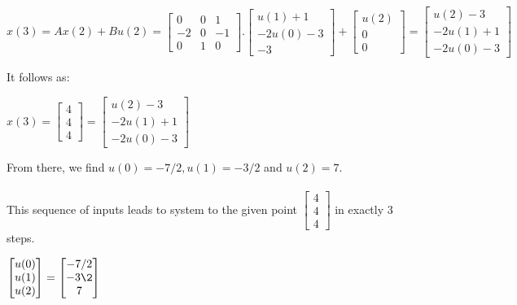 \documentclass[12pt,a4paper, margin=1in]{article}
\begin{document}
\begin{enumerate}
\begin{enumerate}
\begin{center}
    $x(3) = Ax(2) + Bu(2) = 
 \begin{bmatrix}
        0 & 0 & 1 \\
        -2 & 0 & -1 \\
        0 & 1 & 0
    \end{bmatrix}.\begin{bmatrix}
       u(1) +  1 \\ -2u(0)-3 \\ -3 
    \end{bmatrix} + \begin{bmatrix}
       u(2)  \\ 0 \\ 0
    \end{bmatrix} = \begin{bmatrix}
       u(2) - 3  \\ -2u(1) + 1 \\ -2u(0) - 3 
    \end{bmatrix}$
\end{center}
It follows as:
\begin{center}
    $x(3) = \begin{bmatrix}
       4 \\ 4 \\ 4
    \end{bmatrix} = \begin{bmatrix}
       u(2) - 3  \\ -2u(1) + 1 \\ -2u(0) - 3 
    \end{bmatrix}$
\end{center}
From there,  we find $u(0) = -7/2, u(1) = -3/2 $ and $ u(2) = 7$. \\ \\
This sequence of inputs leads to system to the given point $\begin{bmatrix}
       4 \\ 4 \\ 4
    \end{bmatrix}$ in exactly 3 steps. 
        \end{enumerate}
\begin{center}
     $\begin{bmatrix}
       u(0) \\ u(1) \\ u(2)
    \end{bmatrix} = \begin{bmatrix}
       -7/2 \\ -3\2 \\ 7 
    \end{bmatrix}$
\end{center}


\end{enumerate}
\end{document}
